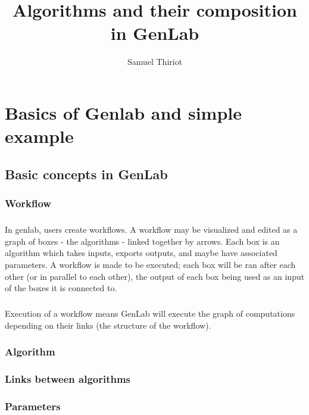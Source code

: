 \documentclass[a4paper,10pt]{book}
\title{Algorithms and their composition in GenLab}
\author{Samuel Thiriot}
\begin{document}
\maketitle

\tableofcontents

\chapter{Basics of Genlab and simple example}

\section{Basic concepts in GenLab}

\subsection{Workflow}

\paragraph*{}
In genlab, users create workflows. A workflow may be visualized and edited as a graph of boxes - the algorithms - linked together by arrows. Each box is an algorithm which takes inputs, exports outputs, and maybe have associated parameters. A workflow is made to be executed; each box will be ran after each other (or in parallel to each other), the output of each box being used as an input of the boxes it is connected to. 

\paragraph*{}
Execution of a workflow means GenLab will execute the graph of computations depending on their links (the structure of the workflow).


\subsection{Algorithm}


\subsection{Links between algorithms}


\subsection{Parameters}
\end{document}
